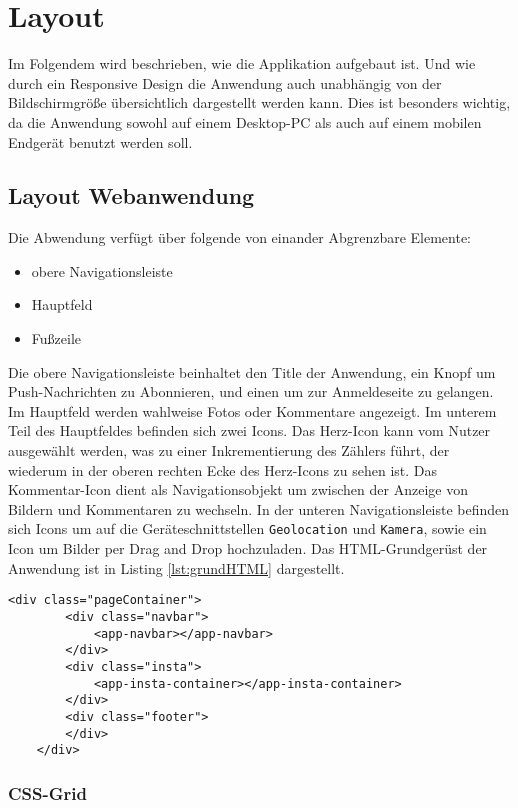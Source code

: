 \chapter{Layout}

Im Folgendem wird beschrieben, wie die Applikation aufgebaut ist. Und wie durch ein Responsive Design die Anwendung auch unabhängig von der Bildschirmgröße übersichtlich dargestellt werden kann. Dies ist besonders wichtig, da die Anwendung sowohl auf einem Desktop-PC als auch auf einem mobilen Endgerät benutzt werden soll. 

\section{Layout Webanwendung}
Die Abwendung verfügt über folgende von einander Abgrenzbare Elemente: 
\begin{itemize}
    \item obere Navigationsleiste
    \item Hauptfeld
    \item Fußzeile
\end{itemize}

Die obere Navigationsleiste beinhaltet den Title der Anwendung, ein Knopf um Push-Nachrichten zu Abonnieren, und einen um zur Anmeldeseite zu gelangen. Im Hauptfeld werden wahlweise Fotos oder Kommentare angezeigt. Im unterem Teil des Hauptfeldes befinden sich zwei Icons. Das Herz-Icon kann vom Nutzer ausgewählt werden, was zu einer Inkrementierung des Zählers führt, der wiederum in der oberen rechten Ecke des Herz-Icons zu sehen ist. Das Kommentar-Icon dient als Navigationsobjekt um zwischen der Anzeige von Bildern und Kommentaren zu wechseln. In der unteren Navigationsleiste befinden sich Icons um auf die Geräteschnittstellen \texttt{Geolocation} und \texttt{Kamera}, sowie ein Icon um Bilder per Drag and Drop hochzuladen.  Das HTML-Grundgerüst der Anwendung ist in Listing \ref{lst:grundHTML} dargestellt. 

\begin{lstlisting}[caption={HTML-Grundgerüst der Webanwendung}, label=lst:grundHTML]
    <div class="pageContainer">
        <div class="navbar">
            <app-navbar></app-navbar>
        </div>
        <div class="insta">
            <app-insta-container></app-insta-container>
        </div>
        <div class="footer">
        </div>
    </div>
\end{lstlisting}

\subsection{CSS-Grid}

